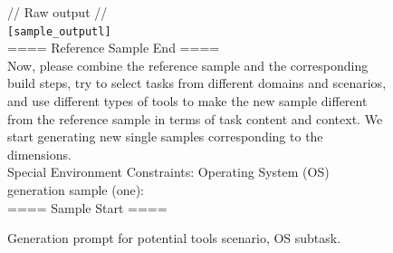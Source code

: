\begin{figure}[!htb]
\begin{tcolorbox}[
    colback=white, 
    colframe=blue2,
    boxrule=0.5mm,
    arc=0mm,
    outer arc=0mm,
    title=Potential Tools: Operating System - Generation Prompt
]
// Raw output //\\
\colorbox{blue2!50}{\texttt{[sample\_outputl]}}\\
==== Reference Sample End ====\\

Now, please combine the reference sample and the corresponding build steps, try to select tasks from different domains and scenarios, and use different types of tools to make the new sample different from the reference sample in terms of task content and context. We start generating new single samples corresponding to the dimensions.\\
Special Environment Constraints: Operating System (OS) generation sample (one):\\
==== Sample Start ====
\end{tcolorbox}
\caption{Generation prompt for potential tools scenario, OS subtask.}
\label{fig:os-prompt}
\end{figure}